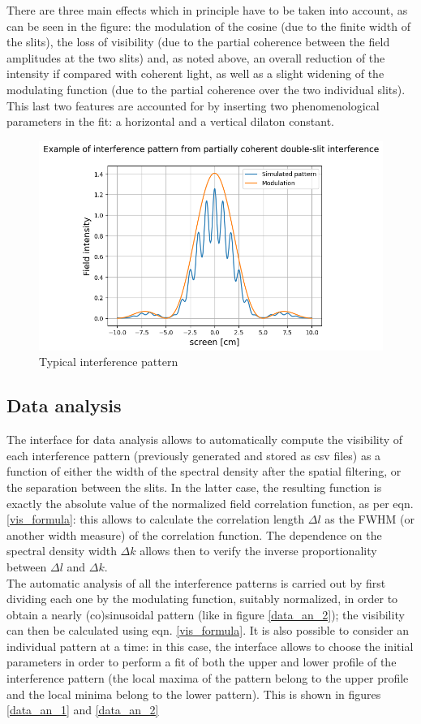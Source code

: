 There are three main effects which in principle have to be taken into account, as can be seen in the figure: 
the modulation of the cosine (due to the finite width of the slits), the loss of visibility (due to the partial coherence between the field amplitudes at the two slits) 
and, as noted above, 
an overall reduction of the intensity if compared with coherent light, as well as a slight widening of the modulating 
function (due to the partial coherence over the two individual slits). This last two features are accounted 
for by inserting two phenomenological parameters in the fit: a horizontal and a vertical dilaton constant.
\begin{figure}[!ht]
    \centering
    \includegraphics[width = .8\textwidth]{Img/output.png}
    \caption{Typical interference pattern}
    \label{patt}
\end{figure}

\subsection{Data analysis}

The interface for data analysis allows to automatically compute the visibility of each interference pattern (previously generated and stored as csv files) as 
a function of either the width of the spectral density after the spatial filtering, or the separation between the slits. In the latter case, the resulting 
function is exactly the absolute value of the normalized field correlation function, as per eqn. \eqref{vis_formula}: this allows to calculate the correlation 
length $\Delta l$ as the FWHM (or another width measure) of the correlation function. The dependence on the spectral density width $\Delta k$ allows then to 
verify the inverse proportionality between $\Delta l$ and $\Delta k$. \\

The automatic analysis of all the interference patterns is carried out by first dividing each one by the modulating function, suitably normalized, in order 
to obtain a nearly (co)sinusoidal pattern (like in figure \ref{data_an_2}); the visibility can then be calculated using eqn. \eqref{vis_formula}. 
It is also possible to consider an individual pattern at a time: in this case, the interface allows to choose the initial parameters in order to perform a 
fit of both the upper and lower profile of the interference pattern (the local maxima of the pattern belong to the upper profile and the local minima belong 
to the lower pattern). This is shown in figures \ref{data_an_1} and \ref{data_an_2}

